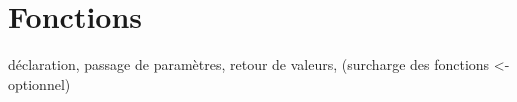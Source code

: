\chapter{Fonctions}

déclaration, passage de paramètres, retour de valeurs, (surcharge des fonctions <- optionnel)